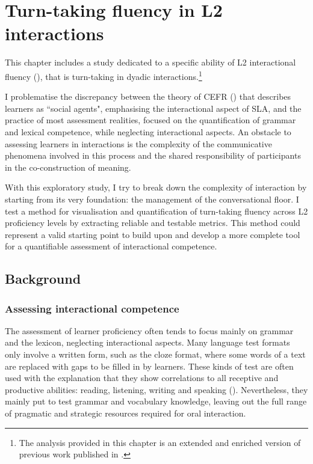\chapter{Turn-taking fluency in L2 interactions}
\graphicspath{{figures/plots-chapter-3}}
\label{chap:3}
This chapter includes a study dedicated to a specific ability of L2 interactional fluency (\citealt{Peltonen2024,Peltonen2020}), that is turn-taking in dyadic interactions.\footnote{The analysis provided in this chapter is an extended and enriched version of previous work published in \citet{SbrannaEtAl2020}.}

I problematise the discrepancy between the theory of CEFR (\citealt{CouncilofEurope2020}) that describes learners as “social agents", emphasising the interactional aspect of SLA, and the practice of most assessment realities, focused on the quantification of grammar and lexical competence, while neglecting interactional aspects. An obstacle to assessing learners in interactions is the complexity of the communicative phenomena involved in this process and the shared responsibility of participants in the co-construction of meaning. 

With this exploratory study, I try to break down the complexity of interaction by starting from its very foundation: the management of the conversational floor. I test a method for visualisation and quantification of turn-taking fluency across L2 proficiency levels by extracting reliable and testable metrics. This method could represent a valid starting point to build upon and develop a more complete tool for a quantifiable assessment of interactional competence.

\section{Background}
\label{sec:3.1}
\subsection{Assessing interactional competence}
\label{sec:3.1.1}
The assessment of learner proficiency often tends to focus mainly on grammar and the lexicon, neglecting interactional aspects. Many language test formats only involve a written form, such as the cloze format, where some words of a text are replaced with gaps to be filled in by learners. These kinds of test are often used with the explanation that they show correlations to all receptive and productive abilities: reading, listening, writing and speaking (\citealt{CouncilOfEurope2001}). Nevertheless, they mainly put to test grammar and vocabulary knowledge, leaving out the full range of pragmatic and strategic resources required for oral interaction.

